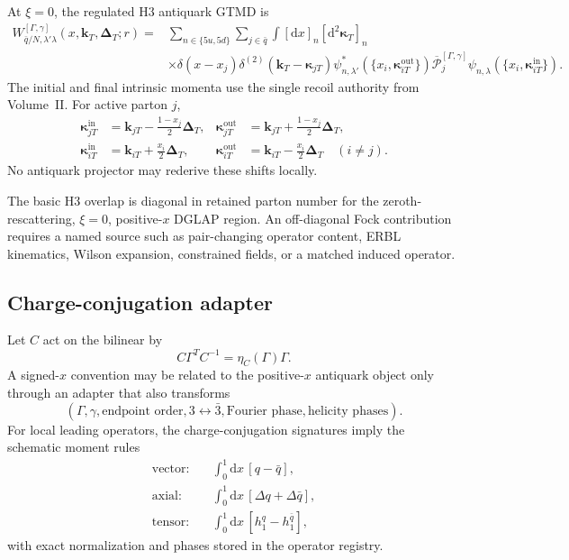 \documentclass[11pt]{article}
\newcommand{\kT}{\bm{k}_{T}}
\newcommand{\DT}{\bm{\Delta}_{T}}
\newcommand{\dd}{\mathrm{d}}
\newcommand{\cP}{\mathcal P}
\begin{document}
At \(\xi=0\), the regulated H3 antiquark GTMD is
\begin{align}
 W_{\bar q/N,\lambda'\lambda}^{[\Gamma,\gamma]}
 (x,\kT,\DT;r)
 ={}&
 \sum_{n\in\{5u,5d\}}
 \sum_{j\in\bar q}
 \int[\dd x]_n[\dd^2\bm\kappa_T]_n
 \nonumber\\
 &\times
 \delta(x-x_j)
 \delta^{(2)}(\kT-\bm\kappa_{jT})
 \psi_{n,\lambda'}^{*}
 \left(\{x_i,\bm\kappa_{iT}^{\mathrm{out}}\}\right)
 \overline{\cP}_{j}^{[\Gamma,\gamma]}
 \psi_{n,\lambda}
 \left(\{x_i,\bm\kappa_{iT}^{\mathrm{in}}\}\right).
 \label{eq:antiquark-overlap}
\end{align}
The initial and final intrinsic momenta use the single recoil authority from
Volume~II.  For active parton \(j\),
\begin{align}
 \bm\kappa_{jT}^{\mathrm{in}}
 &=\bm k_{jT}-\frac{1-x_j}{2}\DT,
 &
 \bm\kappa_{jT}^{\mathrm{out}}
 &=\bm k_{jT}+\frac{1-x_j}{2}\DT,
 \\
 \bm\kappa_{iT}^{\mathrm{in}}
 &=\bm k_{iT}+\frac{x_i}{2}\DT,
 &
 \bm\kappa_{iT}^{\mathrm{out}}
 &=\bm k_{iT}-\frac{x_i}{2}\DT
 \quad(i\ne j).
 \label{eq:antiquark-recoil}
\end{align}
No antiquark projector may rederive these shifts locally.

The basic H3 overlap is diagonal in retained parton number for the
zeroth-rescattering, \(\xi=0\), positive-\(x\) DGLAP region.  An off-diagonal
Fock contribution requires a named source such as pair-changing operator
content, ERBL kinematics, Wilson expansion, constrained fields, or a matched
induced operator.

\subsection{Charge-conjugation adapter}

Let \(C\) act on the bilinear by
\begin{equation}
 C\Gamma^T C^{-1}
 =\eta_C(\Gamma)\Gamma.
\end{equation}
A signed-\(x\) convention may be related to the positive-\(x\) antiquark object
only through an adapter that also transforms
\begin{equation}
 \left(
 \Gamma,
 \gamma,
 \text{endpoint order},
 3\leftrightarrow\bar3,
 \text{Fourier phase},
 \text{helicity phases}
 \right).
\end{equation}
For local leading operators, the charge-conjugation signatures imply the
schematic moment rules
\begin{align}
 \text{vector:}\quad
 &\int_0^1\dd x\,[q-\bar q],
 \\
 \text{axial:}\quad
 &\int_0^1\dd x\,[\Delta q+\Delta\bar q],
 \\
 \text{tensor:}\quad
 &\int_0^1\dd x\,[h_1^q-h_1^{\bar q}],
 \label{eq:c-signatures}
\end{align}
with exact normalization and phases stored in the operator registry.
\end{document}
